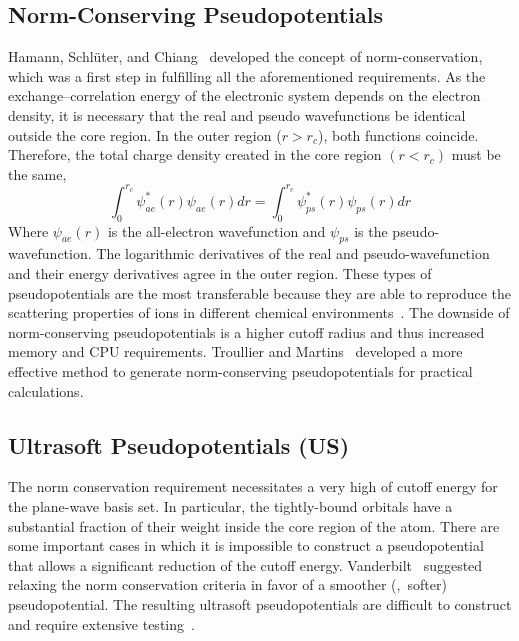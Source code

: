 \subsection{Norm-Conserving Pseudopotentials}
Hamann, Schl\"uter, and Chiang~\cite{hamann1979norm} developed the concept of norm-conservation, which was a first step in fulfilling all the aforementioned requirements. As the exchange--correlation energy of the electronic system depends on the electron density, it is necessary that the real and pseudo wavefunctions be identical outside the core region. In the outer region ($r > r_c$), both functions coincide. Therefore, the total charge density created in the core region $(r < r_c)$ must be the same,
\begin{equation}
\int^{r_{c}}_0 \psi^{\ast}_{ae}(r)\psi_{ae}(r)dr = \int^{r_c}_0 \psi^{\ast}_{ps}(r)\psi_{ps}(r)dr
\end{equation}
Where $\psi_{ae}(r)$ is the all-electron wavefunction and $\psi_{ps}$ is the pseudo-wavefunction. The logarithmic derivatives of the real and pseudo-wavefunction and their energy derivatives agree in the outer region. These types of pseudopotentials are the most transferable because they are able to reproduce the scattering properties of ions in different chemical environments~\cite{hamann1979norm}. The downside of norm-conserving pseudopotentials is a higher cutoff radius and thus increased memory and CPU requirements. Troullier and Martins~\cite{troullier1991efficient} developed a more effective method to generate norm-conserving pseudopotentials for practical calculations. 

\subsection{Ultrasoft Pseudopotentials (US)}
The norm conservation requirement necessitates a very high of cutoff energy for the plane-wave basis set. In particular, the tightly-bound orbitals have a substantial fraction of their weight inside the core region of the atom. There are some important cases in which it is impossible to construct a pseudopotential that allows a significant reduction of the cutoff energy. Vanderbilt~\cite{vanderbilt1990soft} suggested relaxing the norm conservation criteria in favor of a smoother (\ie,\ softer) pseudopotential. The resulting ultrasoft pseudopotentials are difficult to construct and require extensive testing~\cite{kresse1999ultrasoft}.

